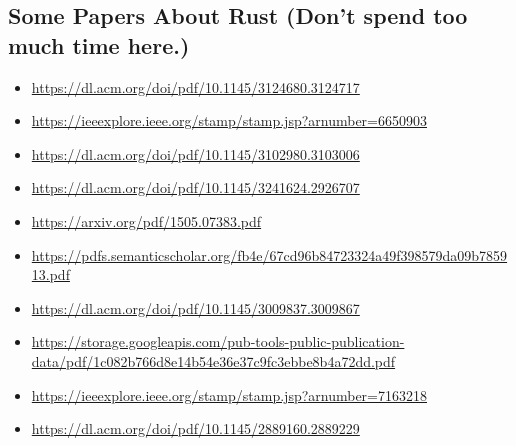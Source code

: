 \documentclass[11pt]{article}
\begin{document}
\subsection{Some Papers About Rust (Don't spend too much time here.)}
\label{sec:orgf1defd6}
\begin{itemize}
\item \url{https://dl.acm.org/doi/pdf/10.1145/3124680.3124717}
\item \url{https://ieeexplore.ieee.org/stamp/stamp.jsp?arnumber=6650903}
\item \url{https://dl.acm.org/doi/pdf/10.1145/3102980.3103006}
\item \url{https://dl.acm.org/doi/pdf/10.1145/3241624.2926707}
\item \url{https://arxiv.org/pdf/1505.07383.pdf}
\item \url{https://pdfs.semanticscholar.org/fb4e/67cd96b84723324a49f398579da09b785913.pdf}
\item \url{https://dl.acm.org/doi/pdf/10.1145/3009837.3009867}
\item \url{https://storage.googleapis.com/pub-tools-public-publication-data/pdf/1c082b766d8e14b54e36e37c9fc3ebbe8b4a72dd.pdf}
\item \url{https://ieeexplore.ieee.org/stamp/stamp.jsp?arnumber=7163218}
\item \url{https://dl.acm.org/doi/pdf/10.1145/2889160.2889229}
\end{itemize}
\end{document}
